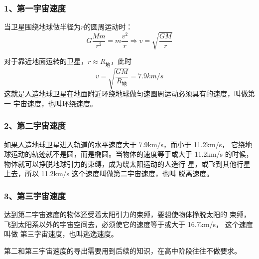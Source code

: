 \subsubsection*{1、第一宇宙速度}
当卫星围绕地球做半径为$r$的圆周运动时：
\begin{equation}
    G\frac{Mm}{r^2}=m\frac{v^2}{r}\Rightarrow v=\sqrt{\frac{GM}{r}}
\end{equation}

对于靠近地面运转的卫星，$r\approx R_{\text{地}}$，此时
\begin{equation}
    v=\sqrt{\frac{GM}{R_{\text{地}}}}=7.9km/s
\end{equation}
这就是人造地球卫星在地面附近环绕地球做匀速圆周运动必须具有的速度，叫做第一
宇宙速度，也叫环绕速度。
\subsubsection*{2、第二宇宙速度}
如果人造地球卫星进入轨道的水平速度大于 7.9km/s，而小于 11.2km/s，
它绕地球运动的轨迹就不是圆，而是椭圆。当物体的速度等于或大于
11.2km/s 的时候，物体就可以挣脱地球引力的束缚，成为绕太阳运动的人造行
星，或飞到其他行星上去，所以 11.2km/s 这个速度叫做第二宇宙速度，也叫
脱离速度。
\subsubsection*{3、第三宇宙速度}
达到第二宇宙速度的物体还受着太阳引力的束缚，要想使物体挣脱太阳的
束缚，飞到太阳系以外的宇宙空间去，必须使它的速度等于或大于 16.7km/s，
这个速度叫做 第三字宙速度，也叫逃逸速度。

第二和第三宇宙速度的导出需要用到后续的知识，在高中阶段往往不做要求。